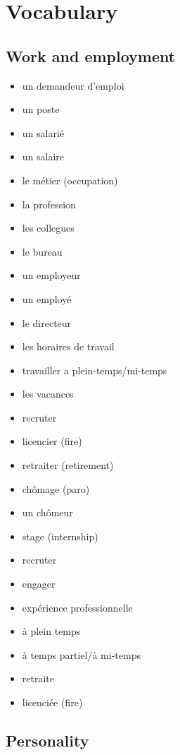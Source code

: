 \documentclass[palatino]{nicenotes}
\begin{document}
\chapter{Vocabulary}

\section{Work and employment}

\begin{multicols}{3}
\begin{itemize}
\item un demandeur d'emploi
\item un poste
\item un salarié
\item un salaire
\item le métier (occupation)
\item la profession
\item les collegues
\item le bureau
\item un employeur
\item un employé
\item le directeur
\item les horaires de travail
\item travailler a plein-temps/mi-temps
\item les vacances
\item recruter
\item licencier (fire)
\item retraiter (retirement)
\item chômage (paro)
\item un chômeur
\item stage (internship)
\item recruter
\item engager
\item expérience professionnelle
\item à plein temps
\item à temps partiel/à mi-temps
\item retraite
\item licenciée (fire)
\end{itemize}
\end{multicols}

\section{Personality}
\end{document}
